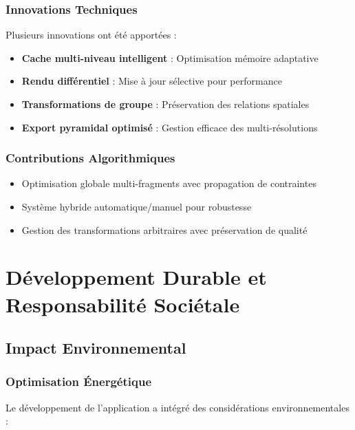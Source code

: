 \documentclass[12pt,a4paper]{article}
\begin{document}
\subsubsection{Innovations Techniques}

Plusieurs innovations ont été apportées :

\begin{itemize}
\item \textbf{Cache multi-niveau intelligent} : Optimisation mémoire adaptative
\item \textbf{Rendu différentiel} : Mise à jour sélective pour performance
\item \textbf{Transformations de groupe} : Préservation des relations spatiales
\item \textbf{Export pyramidal optimisé} : Gestion efficace des multi-résolutions
\end{itemize}

\subsubsection{Contributions Algorithmiques}

\begin{itemize}
\item Optimisation globale multi-fragments avec propagation de contraintes
\item Système hybride automatique/manuel pour robustesse
\item Gestion des transformations arbitraires avec préservation de qualité
\end{itemize}

\newpage

\section{Développement Durable et Responsabilité Sociétale}

\subsection{Impact Environnemental}

\subsubsection{Optimisation Énergétique}

Le développement de l'application a intégré des considérations environnementales :
\end{document}
